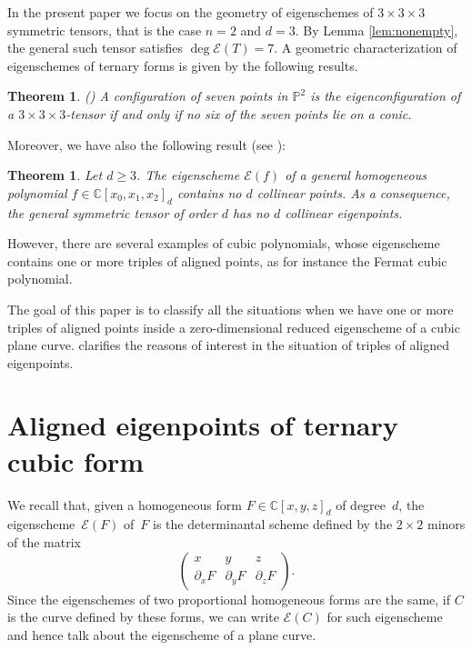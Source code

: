 \documentclass{amsart}
\theoremstyle{plain}
\newtheorem{theorem}[lemma]{Theorem}
\theoremstyle{definition}
\newcommand{\C}{\mathbb{C}}
\newcommand{\p}{\mathbb{P}}
\newcommand{\de}{\partial}
\newcommand{\Eig}[1]{\mathcal{E}\!\left( {#1} \right)}
\begin{document}
 In the present paper we focus on the geometry of eigenschemes of $3\times 3 \times 3$ symmetric tensors, that is the case $n=2$ and $d=3$. By Lemma \ref{lem:nonempty}, the general such tensor
 satisfies $\deg \Eig{T}=7$. A geometric characterization of eigenschemes of ternary forms is given by the following results.

\begin{theorem} (\cite[Theorem 5.1]{ASS})
A configuration of seven points in $\p^2$ is the eigenconfiguration
of a $3\times 3 \times 3$-tensor if and only if no six of the seven points lie on a conic.
\end{theorem}

Moreover, we have also the following result (see \cite[Theorem 5.7]{BGV}):
\begin{theorem}
\label{thm : general no d collinear}
Let $d\ge 3$. The eigenscheme $\Eig{f}$ of a general homogeneous polynomial $f \in \C[x_0,x_1,x_2]_d$ contains no $d$ collinear points. As a
consequence, the general symmetric tensor of order $d$ has no $d$ collinear eigenpoints.
\end{theorem}

However, there are several examples of cubic polynomials, whose eigenscheme contains one or more triples of aligned points, as for instance the Fermat cubic polynomial.

The goal of this paper is to classify all the situations when we have one or more triples of aligned points inside a zero-dimensional reduced eigenscheme of a cubic plane curve.
 clarifies the reasons of interest in the situation of triples of aligned eigenpoints.





\section{Aligned eigenpoints of ternary cubic form}
\label{aligned}

We recall that, given a homogeneous form $F \in \C[x,y,z]_d$ of degree~$d$, the eigenscheme~$\Eig{F}$ of~$F$ is the determinantal scheme defined by the $2 \times 2$ minors of the matrix
%
\begin{equation}
\label{eq:def_matrix}
    \begin{pmatrix}
    x & y & z \\
    \de_x F & \de_y F & \de_z F
    \end{pmatrix}.
\end{equation}
%
Since the eigenschemes of two proportional homogeneous forms are the same,
if $C$ is the curve defined by these forms,
we can write $\Eig{C}$ for such eigenscheme and hence talk about the eigenscheme of a plane curve.
\end{document}

